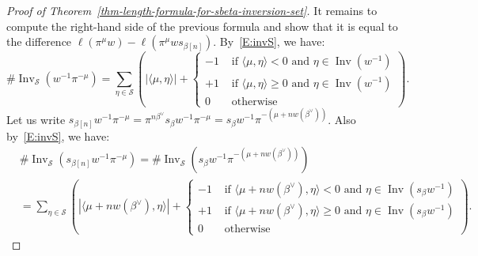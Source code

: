 \documentclass[ALCO,ThmDefs,Unicode]{cedram}
\DeclareMathOperator{\Inv}{Inv}
\newcommand{\betacheck}{\beta^\vee}
\newcommand{\cS}{\mathcal{S}}
\newcommand{\textif}{\text{ if }}
\newcommand{\textand}{\text{ and }}
\begin{document}
\begin{proof}[Proof of Theorem~\ref{thm-length-formula-for-sbeta-inversion-set}]
It remains to compute the right-hand side of the previous formula and show that it is equal to the difference $\ell(\pi^\mu w)-\ell(\pi^\mu ws_{\beta[n]})$. By~\eqref{E:invS}, we have:
\begin{equation*}
\# \Inv_{\cS}(w^{-1} \pi^{-\mu}) = \sum_{\eta \in \cS} \left(|\langle \mu, \eta \rangle| +
\begin{cases}
-1 & \textif \langle \mu, \eta \rangle < 0 \textand \eta \in \Inv(w^{-1}) \\
+1 & \textif \langle \mu, \eta \rangle \geq 0 \textand \eta \in \Inv(w^{-1}) \\
0 & \text{ otherwise}
\end{cases}
\right)\!.
\end{equation*}
Let us write $s_{\beta[n]} w^{-1} \pi^{-\mu} = \pi^{n\betacheck} s_\beta w^{-1} \pi^{-\mu} = s_\beta w^{-1} \pi^{ - (\mu + n w(\betacheck))}$. Also by~\eqref{E:invS}, we have:
\begin{align*}
&\# \Inv_{\cS}(s_{\beta[n]} w^{-1} \pi^{-\mu})= \# \Inv_{\cS}(s_\beta w^{-1} \pi^{ - (\mu + n w(\betacheck))})\\ &=
\sum_{\eta \in \cS} \left(|\langle \mu + n w(\betacheck), \eta \rangle| +
\begin{cases}
-1 & \textif \langle \mu + n w(\betacheck), \eta \rangle < 0 \textand \eta \in \Inv(s_\beta w^{-1}) \\
+1 & \textif \langle \mu + n w(\betacheck), \eta \rangle \geq 0 \textand \eta \in \Inv(s_\beta w^{-1}) \\
0 & \text{ otherwise}
\end{cases}
\right)\!.
\end{align*}


\end{proof}
\end{document}
